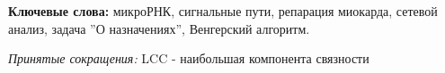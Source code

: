 \vspace{1cm}

\textbf{Ключевые слова:} микроРНК, сигнальные пути, репарация миокарда, сетевой анализ, задача ''О назначениях'', Венгерский алгоритм.

\vspace{1cm}

\textit{Принятые сокращения:} LCC - наибольшая компонента связности